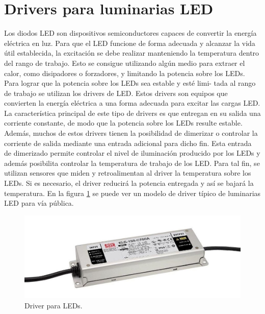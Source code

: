 \section{Drivers para luminarias LED}

Los diodos LED son dispositivos semiconductores capaces de convertir la energía eléctrica en luz. Para que el LED funcione de forma adecuada y alcanzar la vida útil establecida, la excitación se debe realizar manteniendo la temperatura dentro del rango de trabajo. Esto se consigue utilizando algún medio para extraer el calor, como disipadores o forzadores, y limitando la potencia sobre los LEDs. Para lograr que la potencia sobre los LEDs sea estable y esté limi-
tada al rango de trabajo se utilizan los drivers de LED. Estos drivers son equipos que convierten la energía eléctrica a una forma adecuada para excitar las cargas LED. La característica principal de este tipo de drivers es que entregan en su salida una corriente constante, de modo que la potencia sobre los LEDs resulte estable. Además, muchos de estos drivers tienen la posibilidad de dimerizar o controlar la corriente de salida mediante una entrada adicional para dicho fin. Esta entrada de dimerizado permite controlar el nivel de iluminación producido por los LEDs y además posibilita controlar la temperatura de trabajo de los LED. Para tal fin, se utilizan sensores que miden y retroalimentan al driver la temperatura sobre los LEDs. Si es necesario, el driver reducirá la potencia entregada y así se bajará la temperatura.
En la figura \ref{fig:Driver} se puede ver un modelo de driver típico de luminarias LED para vía pública.

\begin{figure}[ht]
	\centering
	\includegraphics[scale=.6]{./Figures/Driver.jpg}
	\caption{Driver para LEDs\protect\footnotemark.}
	\label{fig:Driver}
\end{figure}

